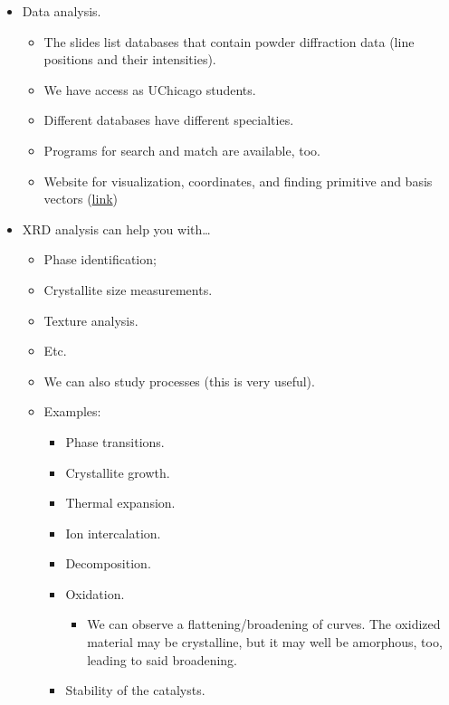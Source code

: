 \documentclass[../notes.tex]{subfiles}
\begin{document}
\begin{itemize}
\begin{itemize}
\begin{itemize}
        \end{itemize}
    \end{itemize}
    \item Data analysis.
    \begin{itemize}
        \item The slides list databases that contain powder diffraction data (line positions and their intensities).
        \item We have access as UChicago students.
        \item Different databases have different specialties.
        \item Programs for search and match are available, too.
        \item Website for visualization, coordinates, and finding primitive and basis vectors (\href{https://www.atomic-scale-physics.de/lattice/struk/a4.html}{link})
    \end{itemize}
    \item XRD analysis can help you with\dots
    \begin{itemize}
        \item Phase identification;
        \item Crystallite size measurements.
        \item Texture analysis.
        \item Etc.
        \item We can also study processes (this is very useful).
        \item Examples:
        \begin{itemize}
            \item Phase transitions.
            \item Crystallite growth.
            \item Thermal expansion.
            \item Ion intercalation.
            \item Decomposition.
            \item Oxidation.
            \begin{itemize}
                \item We can observe a flattening/broadening of curves. The oxidized material may be crystalline, but it may well be amorphous, too, leading to said broadening.
            \end{itemize}
            \item Stability of the catalysts.
        \end{itemize}
    \end{itemize}

\end{itemize}
\end{document}
